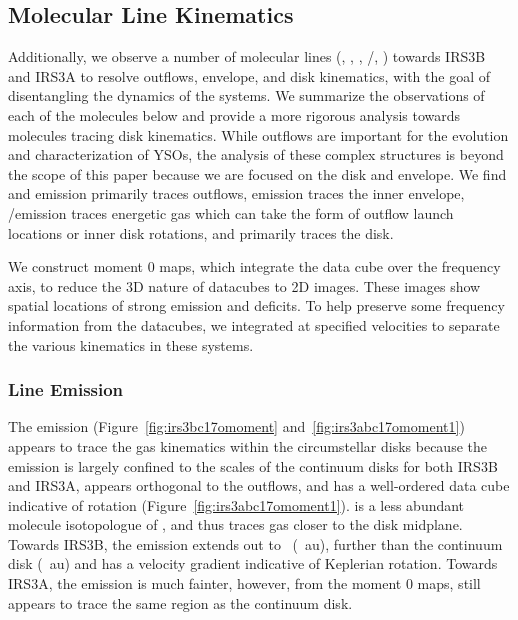 \subsection{Molecular Line Kinematics}\label{sec:kinematics}
Additionally, we observe a number of molecular lines (\co, \sio, \htcop, \htcn/\sot, \cso) towards IRS3B and IRS3A to resolve outflows, envelope, and disk kinematics, with the goal of disentangling the dynamics of the systems. We summarize the observations of each of the molecules below and provide a more rigorous analysis towards molecules tracing disk kinematics. While outflows are important for the evolution and characterization of YSOs, the analysis of these complex structures is beyond the scope of this paper because we are focused on the disk and envelope. We find \co\space and \sio\space emission primarily traces outflows, \htcop\space emission traces the inner envelope, \htcn/\sot\space emission traces energetic gas which can take the form of outflow launch locations or inner disk rotations, and \cso\space primarily traces the disk.


We construct moment 0 maps, which integrate the data cube over the frequency axis, to reduce the 3D nature of datacubes to 2D images. These images show spatial locations of strong emission and deficits. To help preserve some frequency information from the datacubes, we integrated at specified velocities to separate the various kinematics in these systems. %

\subsubsection{\cso\space Line Emission}\label{sec:csoemission}
The \cso\space emission (Figure~\ref{fig:irs3bc17omoment} and~\ref{fig:irs3abc17omoment1}) appears to trace the gas kinematics within the circumstellar disks because the emission is largely confined to the scales of the continuum disks for both IRS3B and IRS3A, appears orthogonal to the outflows, and has a well-ordered data cube indicative of rotation (Figure~\ref{fig:irs3abc17omoment1}). \cso\space is a less abundant molecule \citep[ISM $\lbrack$\co$\rbrack/\lbrack$\cso$\rbrack\approx$1700:1; e.g.][]{1994ARAA..32..191W} isotopologue of \co\space\citep[ISM $\lbrack H_{2}\rbrack/\lbrack$\co$\rbrack\approx$10$^{4}$:1; e.g.][]{2009AA...503..323V}, and thus traces gas closer to the disk midplane. Towards IRS3B, the emission extends out to ~(~au), further than the continuum disk (~au) and has a velocity gradient indicative of Keplerian rotation. Towards IRS3A, the emission is much fainter, however, from the moment 0 maps, \cso\space still appears to trace the same region as the continuum disk.

